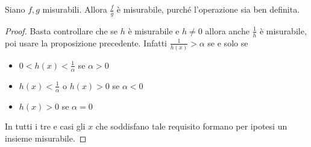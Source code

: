 \begin{proposition}
    Siano \(f,g\) misurabili. Allora \(\frac{f}{g}\) è misurabile, purché
    l'operazione sia ben definita.
\end{proposition}
\begin{proof}
    Basta controllare che se \(h\) è misurabile e \(h\neq 0\) allora anche
    \(\frac{1}{h}\) è misurabile, poi usare la proposizione precedente.
    Infatti \(\frac{1}{h(x)} > \alpha\) se e solo se
\begin{itemize}[label = --]
    \item \(0 < h(x) < \frac{1}{\alpha}\) se \(\alpha > 0\)
    \item \(h(x) < \frac{1}{\alpha}\) o \(h(x) > 0\)  se \(\alpha < 0\)
    \item \(h(x) > 0\) se \(\alpha = 0\)
\end{itemize}
    In tutti i tre e casi gli \(x\) che soddisfano tale requisito formano per
    ipotesi un insieme misurabile.
\end{proof}

